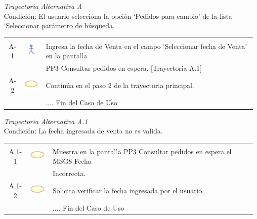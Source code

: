 \documentclass[10pt,spanish]{article}
\providecommand{\tabularnewline}{\\}
\begin{document}
	\textit{Trayectoria Alternativa A}\\
	Condición: El usuario selecciona la opción ‘Pedidos para cambio’ de la lista ‘Seleccionar parámetro de búsqueda.\\
	\begin{tabular}{ccl}
	& & \tabularnewline
	A-1 & \includegraphics{actor} & Ingresa la fecha de Venta en el campo ‘Seleccionar fecha de Venta’ en la pantalla\tabularnewline
	& & PP3 Consultar pedidos en espera. [Trayectoria A.1] \tabularnewline
	A-2 & \includegraphics{sistema} & Continúa en el paso 2 de la trayectoria principal.\tabularnewline	
	 & & .... Fin del Caso de Uso\tabularnewline
	\end{tabular}

	\textit{Trayectoria Alternativa A.1}\\
	Condición: La fecha ingresada de venta no es valida.\\
	\begin{tabular}{ccl}
	& & \tabularnewline
	A.1-1 & \includegraphics{sistema} & Muestra en la pantalla PP3 Consultar pedidos en espera el MSG8 Fecha\tabularnewline
	& & Incorrecta.\tabularnewline 
	A.1-2 & \includegraphics{sistema} & Solicita verificar la fecha ingresada por el usuario.\tabularnewline	
	 & & .... Fin del Caso de Uso\tabularnewline
	\end{tabular}
\end{document}
